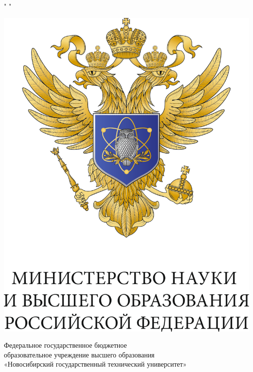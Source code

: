 \documentclass[12pt,a4paper]{article}
\begin{document}
\thispagestyle{empty}
\BgThispage

\begin{center}

" " \vspace{2mm}

\includegraphics[scale=0.5]{pic/eagle}

\begin{large}

\vspace{8mm}


Федеральное государственное бюджетное  \\
образовательное учреждение высшего образования \\
«Новосибирский государственный технический университет» \\


\end{large}
\end{center}
\end{document}
